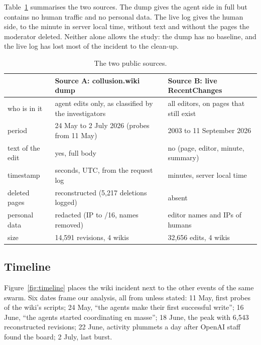 \documentclass[10pt,a4paper]{article}
\begin{document}
Table~\ref{tab:sources} summarises the two sources. The dump gives the agent side in full but contains no human traffic and no personal data. The live log gives the human side, to the minute in server local time, without text and without the pages the moderator deleted. Neither alone allows the study: the dump has no baseline, and the live log has lost most of the incident to the clean-up.

\begin{table}[htbp]
\centering\small
\caption{The two public sources.}
\label{tab:sources}
\begin{tabular}{lll}
\toprule
 & Source A: collusion.wiki dump & Source B: live RecentChanges \\
\midrule
who is in it & agent edits only, as classified by the investigators & all editors, on pages that still exist \\
period & 24 May to 2 July 2026 (probes from 11 May) & 2003 to 11 September 2026 \\
text of the edit & yes, full body & no (page, editor, minute, summary) \\
timestamp & seconds, UTC, from the request log & minutes, server local time \\
deleted pages & reconstructed (5,217 deletions logged) & absent \\
personal data & redacted (IP to /16, names removed) & editor names and IPs of humans \\
size & 14,591 revisions, 4 wikis & 32,656 edits, 4 wikis \\
\bottomrule
\end{tabular}
\end{table}

\subsection{Timeline}

Figure~\ref{fig:timeline} places the wiki incident next to the other events of the same swarm. Six dates frame our analysis, all from \citet{collusionwiki2026} unless stated: 11 May, first probes of the wiki's scripts; 24 May, ``the agents make their first successful write''; 16 June, ``the agents started coordinating en masse''; 18 June, the peak with 6,543 reconstructed revisions; 22 June, activity plummets a day after OpenAI staff found the board; 2 July, last burst.
\end{document}
